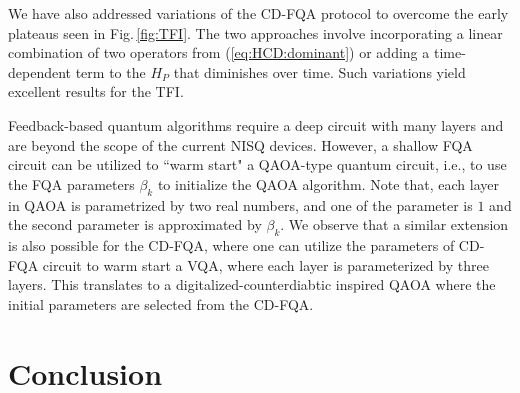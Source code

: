 \documentclass[twocolumn,aps,superscriptaddress,floatfix,longbibliography]{revtex4-2}
\newcommand{\Fig}[1]{Fig.\,\ref{fig:#1}}
\def\YX{\ensuremath{\mathit{YX}}\xspace} %
\def\YZ{\ensuremath{\mathit{YZ}}\xspace}
\def\XX{\ensuremath{\mathit{XX}}\xspace}
\begin{document}
We have also addressed variations of the CD-FQA protocol to overcome the early plateaus seen in \Fig{TFI}. The two approaches involve incorporating a linear combination of two operators from (\ref{eq:HCD:dominant}) or adding a time-dependent term to the $H_{P}$ that diminishes over time. Such variations yield excellent results for the TFI.


 Feedback-based quantum algorithms require a deep circuit with many layers and are beyond the scope of the current NISQ devices. However, a shallow FQA circuit can be utilized to ``warm start" a QAOA-type quantum circuit, i.e., to use the FQA parameters $\beta_{k}$ to initialize the QAOA algorithm. Note that, each layer in QAOA is parametrized by two real numbers, and one of the parameter is $1$ and the second parameter is approximated by $\beta_{k}$. 
 We observe that a similar extension is also possible for the CD-FQA, where one can utilize the parameters of CD-FQA circuit to warm start a VQA, where each layer is parameterized by three layers. This translates to a digitalized-counterdiabtic inspired QAOA \cite{chandarana2022digitized} where the initial parameters are selected from the CD-FQA.    

\section{Conclusion}
\label{sec:conclusion}
\end{document}
